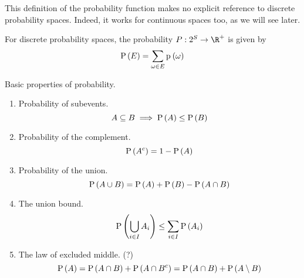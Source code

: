 \documentclass[11pt]{article}
\begin{document}
\begin{rem}
    This definition of the probability function makes no explicit reference to
    discrete probability spaces. Indeed, it works for continuous spaces too, as
    we will see later.
\end{rem}

\begin{rem}
    For discrete probability spaces, the probability $P : 2^S \to \R^+$ is
    given by
    \begin{equation*}
        \P{E} = \sum_{\omega \in E} \p{\omega}
    \end{equation*}
\end{rem}

\begin{lem}
    Basic properties of probability.

    \begin{enumerate}
        \item Probability of subevents.
            \begin{equation*}
                A \subseteq B \implies \P{A} \leq \P{B}
            \end{equation*}

        \item Probability of the complement.
            \begin{equation*}
                \label{eq:complement-probability}
                \P{A^c} = 1 - \P{A}
            \end{equation*}

        \item Probability of the union.
            \begin{equation*}
                \P{A \union B} = \P{A} + \P{B} - \P{A \intersn B}
            \end{equation*}

        \item The union bound.
            \begin{equation}
                \label{eq:union-bound}
                \P{\Union_{i \in I} A_i} \leq \sum_{i \in I} \P{A_i}
            \end{equation}

        \item The law of excluded middle. (?)
            \begin{equation}
                \label{eq:excluded-middle}
                \P{A}
                = \P{A \intersn B} + \P{A \intersn B^c}
                = \P{A \intersn B} + \P{A \setminus B}
            \end{equation}
    \end{enumerate}
\end{lem}
\end{document}
